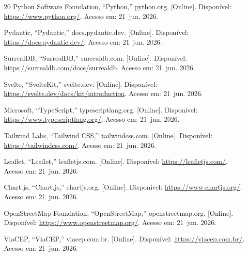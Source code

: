 \documentclass[conference,a4paper]{IEEEtran}
\begin{document}
\begin{thebibliography}{20}
Python Software Foundation, ``Python,'' python.org. [Online]. Disponível: \url{https://www.python.org/}. Acesso em: 21~jun. 2026.

Pydantic, ``Pydantic,'' docs.pydantic.dev. [Online]. Disponível: \url{https://docs.pydantic.dev/}. Acesso em: 21~jun. 2026.

SurrealDB, ``SurrealDB,'' surrealdb.com. [Online]. Disponível: \url{https://surrealdb.com/docs/surrealdb}. Acesso em: 21~jun. 2026.

Svelte, ``SvelteKit,'' svelte.dev. [Online]. Disponível: \url{https://svelte.dev/docs/kit/introduction}. Acesso em: 21~jun. 2026.

Microsoft, ``TypeScript,'' typescriptlang.org. [Online]. Disponível: \url{https://www.typescriptlang.org/}. Acesso em: 21~jun. 2026.

Tailwind Labs, ``Tailwind CSS,'' tailwindcss.com. [Online]. Disponível: \url{https://tailwindcss.com/}. Acesso em: 21~jun. 2026.

Leaflet, ``Leaflet,'' leafletjs.com. [Online]. Disponível: \url{https://leafletjs.com/}. Acesso em: 21~jun. 2026.

Chart.js, ``Chart.js,'' chartjs.org. [Online]. Disponível: \url{https://www.chartjs.org/}. Acesso em: 21~jun. 2026.

OpenStreetMap Foundation, ``OpenStreetMap,'' openstreetmap.org. [Online]. Disponível: \url{https://www.openstreetmap.org/}. Acesso em: 21~jun. 2026.

ViaCEP, ``ViaCEP,'' viacep.com.br. [Online]. Disponível: \url{https://viacep.com.br/}. Acesso em: 21~jun. 2026.

\end{thebibliography}
\end{document}
